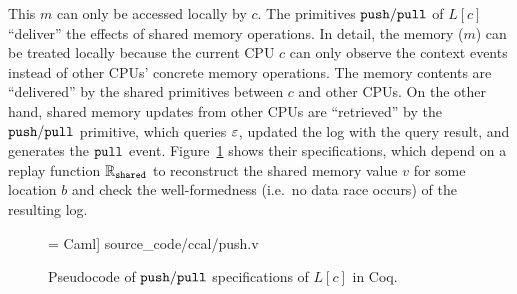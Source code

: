 This $m$ can only be accessed locally by $c$. The primitives ${\mathrm{\texttt{push}}}/{\mathrm{\texttt{pull}}}$ of
$L[c]$  ``deliver'' the effects of shared memory operations.
In detail, the memory ($m$) can be treated locally
because the current CPU $c$ can only observe 
the context events instead of other CPUs'  concrete memory
operations. The memory contents are ``delivered''  by the  shared primitives
between $c$ and other CPUs.
On the other hand, 
shared memory updates from other CPUs are ``retrieved'' by the ${\mathrm{\texttt{push}}}/{\mathrm{\texttt{pull}}}$ primitive, 
which  queries ${\varepsilon}$, updated the log
with the query result, and generates the ${\mathrm{\texttt{pull}}}$ event.
Figure~\ref{fig:exp:pull} shows their specifications, which depend on
a replay function  $\mathbb{R}_{{\mathrm{\texttt{shared}}}}$ to
reconstruct the shared memory value $v$ for some location $b$ and check the well-formedness (i.e.\, no data race occurs)
of the resulting log.







\begin{figure}[t]
 = Caml] {source_code/ccal/push.v}
\caption{Pseudocode of ${\mathrm{\texttt{push}}}/{\mathrm{\texttt{pull}}}$ specifications of $L[c]$ in Coq.}
\label{fig:exp:pull}
\end{figure}

